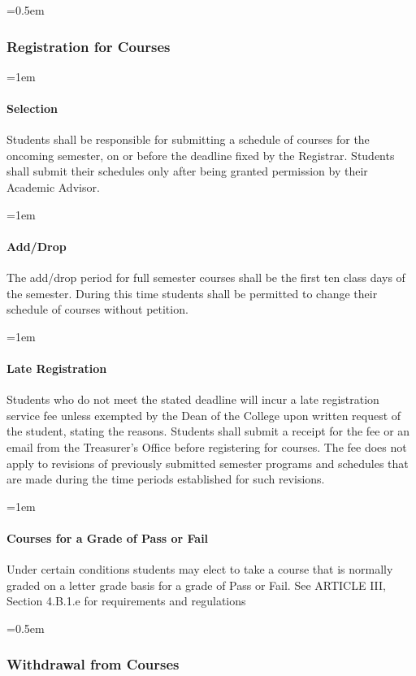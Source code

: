 \documentclass{manual}
\newcommand{\oldbreak}[1]{}
\let\oldsubsubsection\subsubsection
\renewcommand\subsubsection{\leftskip=0.5em\oldsubsubsection}
\let\oldparagraph\paragraph
\renewcommand\paragraph{\leftskip=1em\oldparagraph}
\begin{document}
\oldbreak{V-3}

\subsubsection{Registration for Courses}

\paragraph{Selection}
Students shall be responsible for submitting a schedule of courses for the oncoming semester, on or before the deadline fixed by the Registrar. Students shall submit their schedules only after being granted permission by their Academic Advisor.

\paragraph{Add/Drop}
The add/drop period for full semester courses shall be the first ten class days of the semester. During this time students shall be permitted to change their schedule of courses without petition.

\paragraph{Late Registration}
Students who do not meet the stated deadline will incur a late registration service fee unless exempted by the Dean of the College upon written request of the student, stating the reasons. Students shall submit a receipt for the fee or an email from the Treasurer's Office before registering for courses. The fee does not apply to revisions of previously submitted semester programs and schedules that are made during the time periods established for such revisions.

\paragraph{Courses for a Grade of \textbf{Pass} or Fail}\label{sub:CoursesForGradeOfPassOrFail}

Under certain conditions students may elect to take a course that is normally graded on a letter grade basis for a grade of Pass or Fail. See ARTICLE III, Section 4.B.1.e for requirements and regulations

\subsubsection{Withdrawal from Courses}
\end{document}
